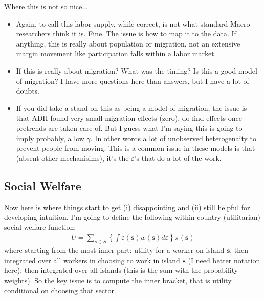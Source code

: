 \documentclass[pdftex,12pt]{article}
\begin{document}
Where this is not so nice...
\begin{itemize}
\item Again, to call this labor supply, while correct, is not what standard Macro researchers think it is. Fine. The issue is how to map it to the data. If anything, this is really about population or migration, not an extensive margin movement like participation falls within a labor market.

\item If this is really about migration? What was the timing? Is this a good model of migration? I have more questions here than answers, but I have a lot of doubts.

\item If you did take a stand on this as being a model of migration, the issue is that ADH found very small migration effects (zero). \citet{greenland2017import} do find effects once pretrends are taken care of. But I guess what I'm saying this is going to imply probably, a low $\gamma$. In other words a lot of unobserved heterogenaity to prevent people from moving. This is a common issue in these models is that (absent other mechanisims), it's the $\varepsilon$'s that do a lot of the work.
\end{itemize}

\newpage

\subsection{Social Welfare}

Now here is where things start to get (i) disappointing and (ii) still helpful for developing intuition. I'm going to define the following within country (utilitarian) social welfare function:
\begin{align}
U = \sum_{s \in S} \left\{\int \varepsilon(\textbf{s}) w(\textbf{s})d\varepsilon \right\} \pi(\textbf{s})
\label{eq:expected_utility}
\end{align}
where starting from the most inner part: utility for a worker on island $\textbf{s}$, then integrated over all workers in choosing to work in island $\textbf{s}$ (I need better notation here), then integrated over all islands (this is the sum with the probability weights). So the key issue is to compute the inner bracket, that is utility conditional on choosing that sector.
\end{document}
